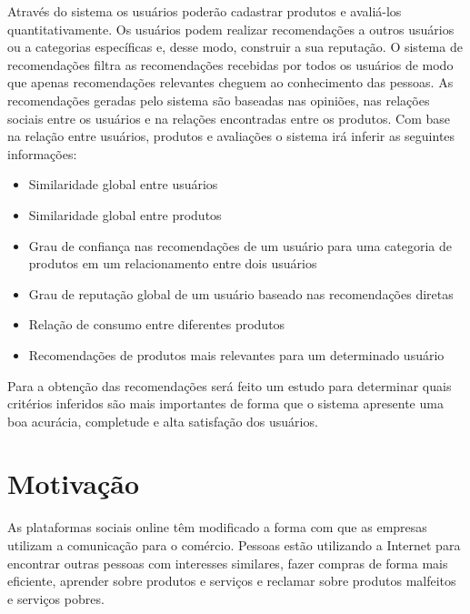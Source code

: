 Através do sistema os usuários poderão cadastrar produtos e avaliá-los quantitativamente. Os usuários podem realizar recomendações a outros usuários ou a categorias específicas e, desse modo, construir a sua reputação. O sistema de recomendações filtra as recomendações recebidas por todos os usuários de modo que apenas recomendações relevantes cheguem ao conhecimento das pessoas. As recomendações geradas pelo sistema são baseadas nas opiniões, nas relações sociais entre os usuários e na relações encontradas entre os produtos. Com base na relação entre usuários, produtos e avaliações o sistema irá inferir as seguintes informações:
\begin{itemize}

    \item Similaridade global entre usuários

    \item Similaridade global entre produtos

    \item Grau de confiança nas recomendações de um usuário para uma categoria de produtos em um relacionamento entre dois usuários

    \item Grau de reputação global de um usuário baseado nas recomendações diretas

    \item Relação de consumo entre diferentes produtos

    \item Recomendações de produtos mais relevantes para um determinado usuário

\end{itemize}

    Para a obtenção das recomendações será feito um estudo para determinar quais critérios inferidos são mais importantes de forma que o sistema apresente uma boa acurácia, completude e alta satisfação dos usuários.

\section{Motivação}

 As plataformas sociais online têm modificado a forma com que as empresas utilizam a comunicação para o comércio. Pessoas estão utilizando a Internet para encontrar outras pessoas com interesses similares, fazer compras de forma mais eficiente, aprender sobre produtos e serviços e reclamar sobre produtos malfeitos e serviços pobres\cite{marketing_social_web}.
 

